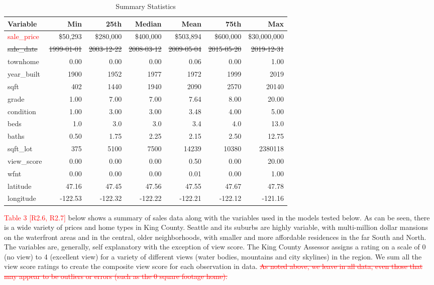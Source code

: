 \documentclass[colTwo]{anon}
\theoremstyle{definition}
\begin{document}
\begin{table*}[h!]
\centering
{\color{red}
\begin{tabular}{l|r|r|r|r|r|r}
\hline
\textbf{Variable} & \textbf{Min} & \textbf{25th} & \textbf{Median} & \textbf{Mean} & \textbf{75th} & \textbf{Max}\\
\hline
\textcolor{red}{sale\_price} & \$50,293 & \$280,000 & \$400,000 & \$503,894 & \$600,000 & \$30,000,000\\
\st{sale\_date} & \st{1999-01-01} & \st{2003-12-22} & \st{2008-03-12} & \st{2009-05-04} & \st{2015-05-20} & \st{2019-12-31}\\
townhome & 0.00 & 0.00 & 0.00 & 0.06 & 0.00 & 1.00 \\
year\_built & 1900 & 1952 & 1977 & 1972 & 1999 & 2019\\
sqft & 402 & 1440 & 1940 & 2090 & 2570 & 20140\\
grade & 1.00 & 7.00 & 7.00 & 7.64 & 8.00 & 20.00\\
condition & 1.00 & 3.00 & 3.00 & 3.48 & 4.00 & 5.00\\
beds & 1.0 & 3.0 & 3.0 & 3.4 & 4.0 & 13.0\\
baths & 0.50 & 1.75 & 2.25 & 2.15 & 2.50 & 12.75\\
sqft\_lot & 375 & 5100 & 7500 & 14239 & 10380 & 2380118\\
view\_score & 0.00 & 0.00 & 0.00 & 0.50 & 0.00 & 20.00\\
wfnt & 0.00 & 0.00 & 0.00 & 0.01 & 0.00 & 1.00\\
latitude & 47.16 & 47.45 & 47.56 & 47.55 & 47.67 & 47.78\\
longitude & -122.53 & -122.32 & -122.22 & -122.21 & -122.12 & -121.16\\
\hline
\end{tabular}}
\caption{Summary Statistics}
\label{table:3}
\end{table*}

\textcolor{red}{Table 3 [R2.6, R2.7]} below shows a summary of sales data along with the variables used in the models tested below. As can be seen, there is a wide variety of prices and home types in King County.  Seattle and its suburbs are highly variable, with multi-million dollar mansions on the waterfront areas and in the central, older neighborhoods, with smaller and more affordable residences in the far South and North.  The variables are, generally, self explanatory with the exception of view score.  The King County Assessor assigns a rating on a scale of 0 (no view) to 4 (excellent view) for a variety of different views (water bodies, mountains and city skylines) in the region. We sum all the view score ratings to create the composite view score for each observation in data.  \textcolor{red}{\st{As noted above, we leave in all data, even those that may appear to be outliers or errors (such as the 0 square footage home).}} 
\end{document}
